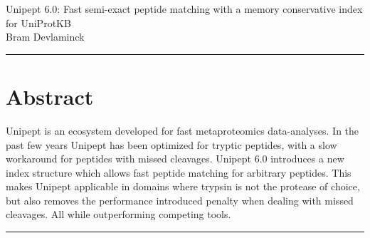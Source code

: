 \documentclass[11pt]{article}
\begin{document}
    \begingroup
    \centering
    \LARGE Unipept 6.0: Fast semi-exact peptide matching with a memory conservative index for UniProtKB\\[1em]
    \large Bram Devlaminck\\[2em]
    \endgroup

    \par\noindent\rule{\linewidth}{.5pt}
    \section*{Abstract}\label{sec:test-section}
    Unipept is an ecosystem developed for fast metaproteomics data-analyses.
    In the past few years Unipept has been optimized for tryptic peptides, with a slow workaround for peptides with missed cleavages.
    Unipept 6.0 introduces a new index structure which allows fast peptide matching for arbitrary peptides.
    This makes Unipept applicable in domains where trypsin is not the protease of choice, but also removes the performance introduced penalty when dealing with missed cleavages.
    All while outperforming competing tools.
    \par\noindent\rule{\linewidth}{.5pt}
\end{document}

